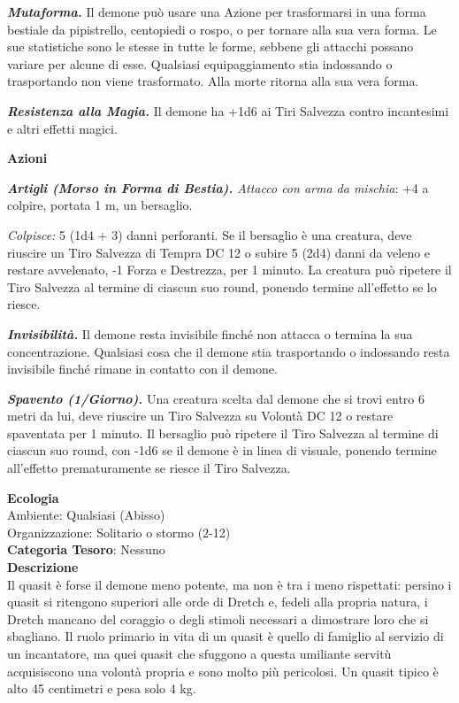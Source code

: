 \begin{multicols}{2}
{\emph{\textbf{Mutaforma.}} Il demone può usare una Azione per trasformarsi in una forma bestiale da pipistrello, centopiedi o rospo, o per tornare alla sua vera forma. Le sue statistiche sono le stesse in tutte le forme, sebbene gli attacchi possano variare per alcune di esse. Qualsiasi equipaggiamento stia indossando o trasportando non viene trasformato. Alla morte ritorna alla sua vera forma.

\emph{\textbf{Resistenza alla Magia.}} Il demone ha +1d6 ai Tiri Salvezza contro incantesimi e altri effetti magici.

\textbf{Azioni}

\emph{\textbf{Artigli (Morso in Forma di Bestia).} Attacco con arma da mischia}: +4 a colpire, portata 1 m, un bersaglio.

\emph{Colpisce:} 5 (1d4 + 3) danni perforanti. Se il bersaglio è una creatura, deve riuscire un Tiro Salvezza di Tempra DC 12 o subire 5 (2d4) danni da veleno e restare avvelenato, -1 Forza e Destrezza, per 1 minuto. La creatura può ripetere il Tiro Salvezza al termine di ciascun suo round, ponendo termine all'effetto se lo riesce.

\emph{\textbf{Invisibilità.}} Il demone resta invisibile finché non attacca o termina la sua concentrazione. Qualsiasi cosa che il demone stia trasportando o indossando resta invisibile finché rimane in contatto con il demone.

\emph{\textbf{Spavento (1/Giorno).}} Una creatura scelta dal demone che si trovi entro 6 metri da lui, deve riuscire un Tiro Salvezza su Volontà DC 12 o restare spaventata per 1 minuto. Il bersaglio può ripetere il Tiro Salvezza al termine di ciascun suo round, con -1d6 se il demone è in linea di visuale, ponendo termine all'effetto prematuramente se riesce il Tiro Salvezza.

\textbf{Ecologia}\\
Ambiente: Qualsiasi (Abisso)\\
Organizzazione: Solitario o stormo (2-12)\\
\textbf{Categoria Tesoro}: Nessuno\\
\textbf{Descrizione}\\
Il quasit è forse il demone meno potente, ma non è tra i meno rispettati: persino i quasit si ritengono superiori alle orde di Dretch e, fedeli alla propria natura, i Dretch mancano del coraggio o degli stimoli necessari a dimostrare loro che si sbagliano. Il ruolo primario in vita di un quasit è quello di famiglio al servizio di un incantatore, ma quei quasit che sfuggono a questa umiliante servitù acquisiscono una volontà propria e sono molto più pericolosi. Un quasit tipico è alto 45 centimetri e pesa solo 4 kg.

}
\end{multicols}
